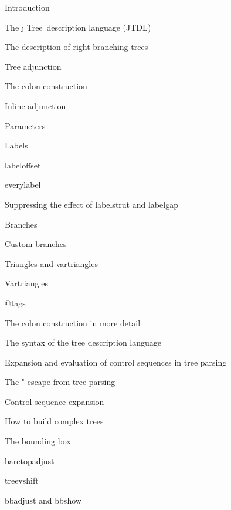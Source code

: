  {Introduction } \par 
{} {The \j \kern -1.8pt Tree\ description language (JTDL) } \par 
{} {The description of right branching trees} \par 
{} {Tree adjunction} \par 
{} {The colon construction} \par 
{} {Inline adjunction} \par 
{} {Parameters } \par 
{} {Labels } \par 
{} {\fam \slfam \twelvesl labeloffset} \par 
{} {\fam \slfam \twelvesl everylabel} \par 
{} {Suppressing the effect of {\fam \slfam \twelvesl labelstrut\/} and {\fam \slfam \twelvesl labelgap}} \par 
{} {Branches } \par 
{} {Custom branches} \par 
{} {Triangles and vartriangles } \par 
{} {Vartriangles} \par 
{} {@tags } \par 
{} {The colon construction in more detail } \par 
{} {The syntax of the tree description language} \par 
{} {Expansion and evaluation of control sequences in tree parsing } \par 
{} {The {\fam \ttfam \twelvett "} escape from tree parsing} \par 
{} {Control sequence expansion} \par 
{} {How to build complex trees } \par 
{} {The bounding box } \par 
{} {\fam \slfam \twelvesl baretopadjust} \par 
{} {\fam \slfam \twelvesl treevshift} \par 
{} {{\fam \slfam \twelvesl bbadjust\/} and {\fam \slfam \twelvesl bbshow}} \par 
